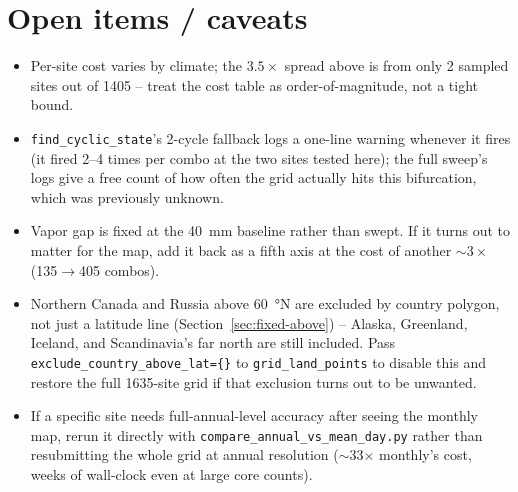 \documentclass[11pt]{article}
\begin{document}
\section{Open items / caveats}
\begin{itemize}
  \item Per-site cost varies by climate; the $3.5\times$ spread above is from only 2 sampled
  sites out of 1405 -- treat the cost table as order-of-magnitude, not a tight bound.
  \item \texttt{find\_cyclic\_state}'s 2-cycle fallback logs a one-line warning whenever it
  fires (it fired 2--4 times per combo at the two sites tested here); the full sweep's logs give
  a free count of how often the grid actually hits this bifurcation, which was previously
  unknown.
  \item Vapor gap is fixed at the \SI{40}{\milli\meter} baseline rather than swept. If it turns
  out to matter for the map, add it back as a fifth axis at the cost of another $\sim3\times$
  (135$\to$405 combos).
  \item Northern Canada and Russia above \SI{60}{\degree}N are excluded by country polygon, not
  just a latitude line (Section~\ref{sec:fixed-above}) -- Alaska, Greenland, Iceland, and
  Scandinavia's far north are still included. Pass
  \texttt{exclude\_country\_above\_lat=\{\}} to \texttt{grid\_land\_points} to disable this and
  restore the full 1635-site grid if that exclusion turns out to be unwanted.
  \item If a specific site needs full-annual-level accuracy after seeing the monthly map, rerun
  it directly with \texttt{compare\_annual\_vs\_mean\_day.py} rather than resubmitting the whole
  grid at annual resolution ($\sim$33$\times$ monthly's cost, weeks of wall-clock even at large
  core counts).
\end{itemize}
\end{document}
